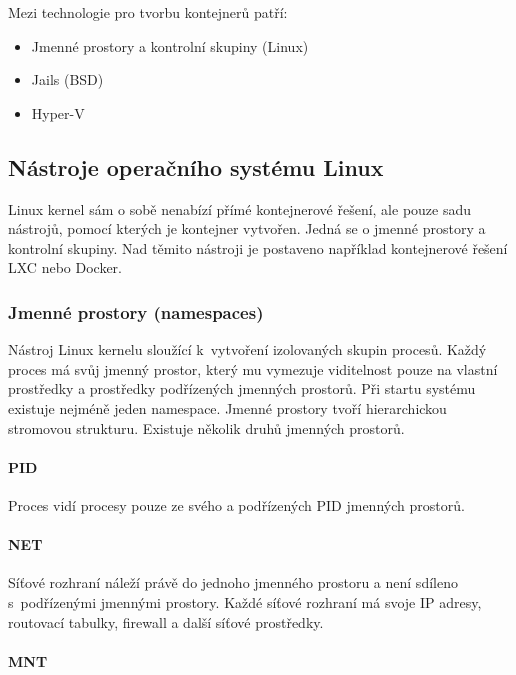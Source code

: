 {
Mezi technologie pro tvorbu kontejnerů patří:

\begin{itemize}
	\item Jmenné prostory a kontrolní skupiny (Linux)
	\item Jails (BSD)
	\item Hyper-V
\end{itemize}
}

\subsection{Nástroje operačního systému Linux}

Linux kernel sám o sobě nenabízí přímé kontejnerové řešení, ale pouze sadu nástrojů, pomocí kterých je kontejner vytvořen.
Jedná se o jmenné prostory a kontrolní skupiny.
Nad těmito nástroji je postaveno například kontejnerové řešení LXC nebo Docker.

\subsubsection{Jmenné prostory (namespaces)}

Nástroj Linux kernelu sloužící k~vytvoření izolovaných skupin procesů.
Každý proces má svůj jmenný prostor, který mu vymezuje viditelnost pouze na vlastní prostředky a prostředky podřízených jmenných prostorů.
Při startu systému existuje nejméně jeden namespace.
Jmenné prostory tvoří hierarchickou stromovou strukturu.
Existuje několik druhů jmenných prostorů.

\paragraph{PID}

Proces vidí procesy pouze ze svého a podřízených PID jmenných prostorů.

\paragraph{NET}

Síťové rozhraní náleží právě do jednoho jmenného prostoru a není sdíleno s~podřízenými jmennými prostory.
Každé síťové rozhraní má svoje IP adresy, routovací tabulky, firewall a další síťové prostředky. 

\paragraph{MNT}

